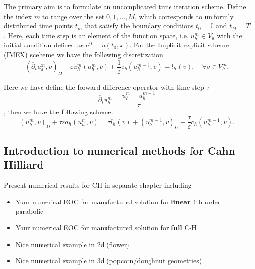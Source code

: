 The primary aim is to formulate an uncomplicated time iteration scheme. Define the index $m$ to range over the set ${0, 1, \ldots, M}$, which corresponds to uniformly distributed time points $t_{m}$ that satisfy the boundary conditions $t_{0} = 0$
and $t_{M} = T$. Here, each time step is an element of the function space, i.e. $u^{m}_{h} \in V_{h}$  with the initial condition defined as $u^{0} = u( t_{0},x )$.
For the Implicit explicit scheme (IMEX) sceheme we have the following discretization
\[
( \overline{\partial } _{t} u^{m}_{h}, v   )_{\Omega } + \varepsilon a^{m}_{h}( u_{h}^{m} , v) + \frac{1}{\varepsilon } c_{h} (  u_{h}^{m-1}, v)  = l_{h}( v) , \quad \forall v \in V_{h}^{m}.
\]

Here we have define the forward difference operator with time step $\tau $
\[
\overline{\partial } _{t} u_{h}^{m} = \frac{u_{h}^{m} - u_{h}^{m-1}}{ \tau }
\]
, then we have the following scheme.
\[
( u_{h}^{m},v )_{\Omega }  + \tau \varepsilon a_{h}( u_{h}^{m} , v)   = \tau  l_{h}( v) +   ( u_{h}^{m-1},v )_{\Omega } - \frac{\tau}{\varepsilon } c_{h} (  u_{h}^{m-1}, v) .
\]



\subsection{Introduction to numerical methods for Cahn Hilliard}%
\label{sub:introduction_to_numerical_methods_for_cahn_hilliard}

Present numerical results for CH in separate chapter including
\begin{itemize}
    \item Your numerical EOC for  manufactured solution for \textbf{linear} 4th order parabolic
    \item Your numerical EOC for  manufactured solution for \textbf{full} C-H
    \item Nice numerical example in 2d (flower)
    \item Nice numerical example in 3d (popcorn/doughnut geometries)
\end{itemize}


